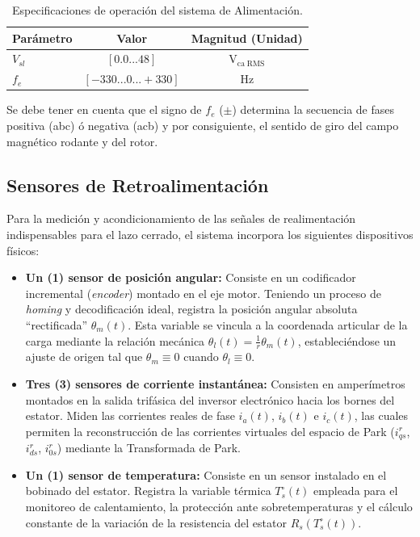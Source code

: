 \documentclass[blue,fullpaper]{ludusofficial}  %
\begin{document}
\begin{table}[htbp]
    \centering
    \caption{Especificaciones de operación del sistema de Alimentación.}
    \label{tab:parametros_carga}
    \begin{tabular}{lcc}
        \hline
        \textbf{Parámetro} & \textbf{Valor} & \textbf{Magnitud (Unidad)} \\
        \hline
        $V_{sl}$ & $[0.0 ... 48]$ & $\mathrm{V_{ca \; RMS}}$ \\
        $f_e$ & $[-330 ... 0 ... +330]$ & $\mathrm{Hz}$ \\
        \hline
    \end{tabular}
\end{table}

Se debe tener en cuenta que el signo de $f_e$ ($\pm$) determina la secuencia de fases positiva (abc) ó negativa (acb) y por consiguiente, el sentido de giro del campo magnético rodante y del rotor.

\subsection{Sensores de Retroalimentación}
Para la medición y acondicionamiento de las señales de realimentación indispensables para el lazo cerrado, el sistema incorpora los siguientes dispositivos físicos:

\begin{itemize}
    \item \textbf{Un (1) sensor de posición angular:} Consiste en un codificador incremental (\textit{encoder}) montado en el eje motor. Teniendo un proceso de \textit{homing} y decodificación ideal, registra la posición angular absoluta ``rectificada'' $\theta_m(t)$. Esta variable se vincula a la coordenada articular de la carga mediante la relación mecánica $\theta_l(t) = \frac{1}{r} \theta_m(t)$, estableciéndose un ajuste de origen tal que $\theta_m \equiv 0$ cuando $\theta_l \equiv 0$.
    \item \textbf{Tres (3) sensores de corriente instantánea:} Consisten en amperímetros montados en la salida trifásica del inversor electrónico hacia los bornes del estator. Miden las corrientes reales de fase $i_a(t)$, $i_b(t)$ e $i_c(t)$, las cuales permiten la reconstrucción de las corrientes virtuales del espacio de Park ($i_{qs}^r$, $i_{ds}^r$, $i_{0s}^r$) mediante la Transformada de Park.
    \item \textbf{Un (1) sensor de temperatura:} Consiste en un sensor instalado en el bobinado del estator. Registra la variable térmica $T_s^\circ(t)$ empleada para el monitoreo de calentamiento, la protección ante sobretemperaturas y el cálculo constante de la variación de la resistencia del estator $R_s(T_s^\circ(t))$.
\end{itemize}
\end{document}
